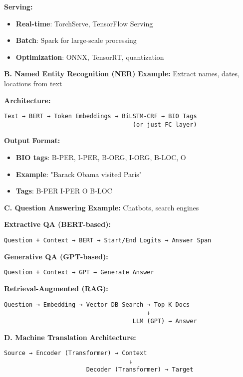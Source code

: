 \documentclass[8pt,landscape]{article}
\begin{document}
\begin{multicols}{3}
\textbf{Serving:}
\begin{itemize}
\item \textbf{Real-time}: TorchServe, TensorFlow Serving
\item \textbf{Batch}: Spark for large-scale processing
\item \textbf{Optimization}: ONNX, TensorRT, quantization
\end{itemize}

\textbf{B. Named Entity Recognition (NER)}
\textbf{Example:} Extract names, dates, locations from text

\textbf{Architecture:}
\begin{verbatim}
Text → BERT → Token Embeddings → BiLSTM-CRF → BIO Tags
                                    (or just FC layer)
\end{verbatim}

\textbf{Output Format:}
\begin{itemize}
\item \textbf{BIO tags}: B-PER, I-PER, B-ORG, I-ORG, B-LOC, O
\item \textbf{Example}: "Barack Obama visited Paris"
\item \textbf{Tags}: B-PER I-PER O B-LOC
\end{itemize}

\textbf{C. Question Answering}
\textbf{Example:} Chatbots, search engines

\textbf{Extractive QA (BERT-based):}
\begin{verbatim}
Question + Context → BERT → Start/End Logits → Answer Span
\end{verbatim}

\textbf{Generative QA (GPT-based):}
\begin{verbatim}
Question + Context → GPT → Generate Answer
\end{verbatim}

\textbf{Retrieval-Augmented (RAG):}
\begin{verbatim}
Question → Embedding → Vector DB Search → Top K Docs
                                        ↓
                                    LLM (GPT) → Answer
\end{verbatim}

\textbf{D. Machine Translation}
\textbf{Architecture:}
\begin{verbatim}
Source → Encoder (Transformer) → Context
                                   ↓
                       Decoder (Transformer) → Target
\end{verbatim}


\end{multicols}
\end{document}

